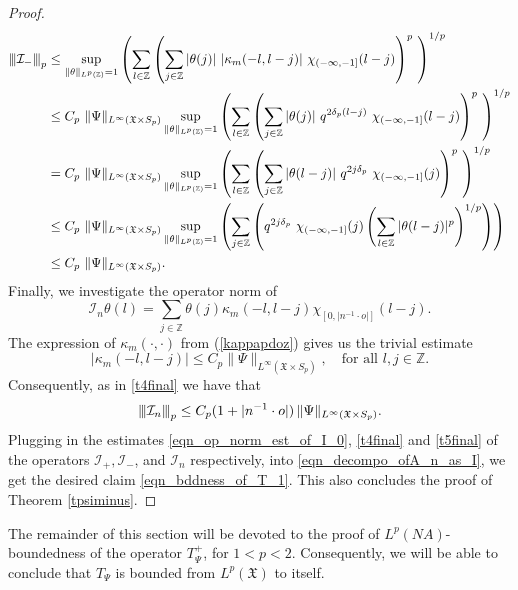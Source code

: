 \documentclass[12pt,reqno]{amsart}
\newcommand{\vertiii}[1]{{\left\vert\kern-0.25ex\left\vert\kern-0.25ex\left\vert #1 
		\right\vert\kern-0.25ex\right\vert\kern-0.25ex\right\vert}}
\theoremstyle{definition}
\theoremstyle{definition}
\numberwithin{equation}{section}
\begin{document}
\begin{proof}
\begin{align}
		\vertiii{\mathcal{I}_-}_{p}&\leq\sup\limits_{\|\theta\|_{L^{p}(\mathbb{Z})}=1}\left(\sum\limits_{l\in\mathbb{Z}}\left(\sum\limits_{j\in\mathbb{Z}}|\theta(j)|~|\kappa_{m}(-l,l-j)|~\chi_{(-\infty,-1]}(l-j)\right)^{p}~\right)^{1/p}\nonumber\\
		&\leq C_{p}~\|\Psi\|_{L^{\infty}(\mathfrak{X}\times S_{p})}\sup\limits_{\|\theta\|_{L^{p}(\mathbb{Z})}=1}\left(\sum\limits_{l\in\mathbb{Z}}\left(\sum\limits_{j\in\mathbb{Z}}|\theta(j)|~q^{2\delta_{p}(l-j)}~\chi_{(-\infty,-1]}(l-j)\right)^{p}~\right)^{1/p}\nonumber\\
		&=C_{p}~\|\Psi\|_{L^{\infty}(\mathfrak{X}\times S_{p})}\sup\limits_{\|\theta\|_{L^{p}(\mathbb{Z})}=1}\left(\sum\limits_{l\in\mathbb{Z}}\left(\sum\limits_{j\in\mathbb{Z}}|\theta(l-j)|~q^{2j\delta_{p}}~\chi_{(-\infty,-1]}(j)\right)^{p}~\right)^{1/p}\nonumber\\
		&\leq C_{p}~\|\Psi\|_{L^{\infty}(\mathfrak{X}\times S_{p})}\sup\limits_{\|\theta\|_{L^{p}(\mathbb{Z})}=1}\left(\sum\limits_{j\in\mathbb{Z}}\left(q^{2j\delta_{p}}~\chi_{(-\infty,-1]}(j)\left(\sum\limits_{l\in\mathbb{Z}}|\theta(l-j)|^{p}\right)^{1/p}\right)\right)\nonumber\\
		&\leq C_{p}~\|\Psi\|_{L^{\infty}(\mathfrak{X}\times S_{p})}.
\end{align}
Finally, we investigate the operator norm of
	$$\mathcal{I}_n\theta(l)=\sum\limits_{j\in\mathbb{Z}}\theta(j)\kappa_{m}(-l,l-j)\chi_{[0,|n^{-1}\cdot o|]}(l-j).$$
The expression of $\kappa_{m}(\cdot,\cdot)$ from (\ref{kappapdoz}) gives us the trivial estimate
	$$|\kappa_{m}(-l,l-j)|\leq C_{p}\|\Psi\|_{L^{\infty}(\mathfrak{X}\times S_{p})},\quad\text{for all }l,j\in\mathbb{Z}.$$
Consequently, as in \eqref{t4final} we have that
	\begin{equation}\label{t5final}
		\vertiii{\mathcal{I}_n}_{p}\leq C_{p}(1+|n^{-1}\cdot o|)\,\|\Psi\|_{L^{\infty}(\mathfrak{X}\times S_{p})}.
	\end{equation}
Plugging in the estimates \eqref{eqn_op_norm_est_of_I_0}, \eqref{t4final} and \eqref{t5final} of the operators $ \mathcal{I}_+, \mathcal{I}_-$, and $\mathcal{I}_n $ respectively,  into \eqref{eqn_decompo_ofA_n_as_I}, we get the desired  claim \eqref{eqn_bddness_of_T_1}. This also concludes the proof of Theorem \ref{tpsiminus}.
\end{proof}
The remainder of this section will be devoted to the proof of $ L^p(NA) $-boundedness of the operator   $ T_\Psi ^+$, for $1<p<2$. Consequently, we will be able to conclude that $ T_\Psi $ is bounded from $ L^p(\mathfrak{X}) $ to itself.  
   
\end{document}
